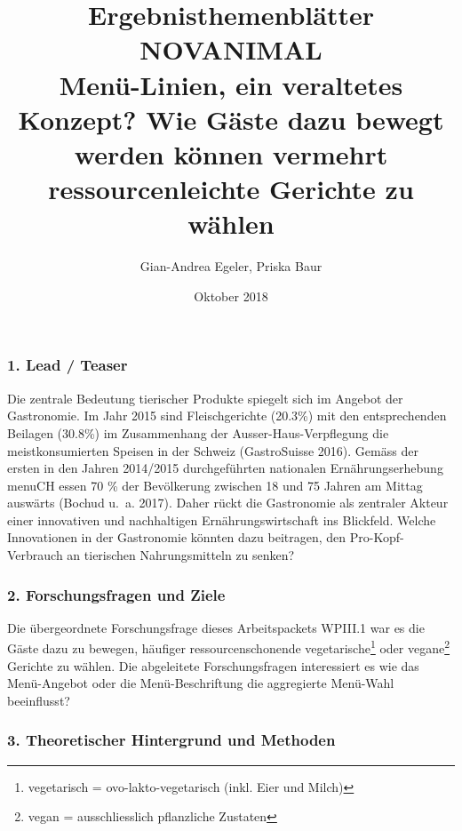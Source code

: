 \documentclass[12pt,ngerman,]{article}
\title{Ergebnisthemenblätter NOVANIMAL\\
Menü-Linien, ein veraltetes Konzept? Wie Gäste dazu bewegt werden können
vermehrt ressourcenleichte Gerichte zu wählen}
\author{Gian-Andrea Egeler, Priska Baur}
\date{Oktober 2018}
\let\rmarkdownfootnote\footnote%
\def\footnote{\protect\rmarkdownfootnote}
\begin{document}
\maketitle

\hypertarget{lead-teaser}{%
\subsubsection{1. Lead / Teaser}\label{lead-teaser}}

Die zentrale Bedeutung tierischer Produkte spiegelt sich im Angebot der
Gastronomie. Im Jahr 2015 sind Fleischgerichte (20.3\%) mit den
entsprechenden Beilagen (30.8\%) im Zusammenhang der
Ausser-Haus-Verpflegung die meistkonsumierten Speisen in der Schweiz
(GastroSuisse 2016). Gemäss der ersten in den Jahren 2014/2015
durchgeführten nationalen Ernährungserhebung menuCH essen 70 \% der
Bevölkerung zwischen 18 und 75 Jahren am Mittag auswärts (Bochud u.~a.
2017). Daher rückt die Gastronomie als zentraler Akteur einer
innovativen und nachhaltigen Ernährungswirtschaft ins Blickfeld. Welche
Innovationen in der Gastronomie könnten dazu beitragen, den
Pro-Kopf-Verbrauch an tierischen Nahrungsmitteln zu senken?

\hypertarget{forschungsfragen-und-ziele}{%
\subsubsection{2. Forschungsfragen und
Ziele}\label{forschungsfragen-und-ziele}}

Die übergeordnete Forschungsfrage dieses Arbeitspackets WPIII.1 war es
die Gäste dazu zu bewegen, häufiger ressourcenschonende
vegetarische\footnote{vegetarisch = ovo-lakto-vegetarisch (inkl. Eier
  und Milch)} oder vegane\footnote{vegan = ausschliesslich pflanzliche
  Zustaten} Gerichte zu wählen. Die abgeleitete Forschungsfragen
interessiert es wie das Menü-Angebot oder die Menü-Beschriftung die
aggregierte Menü-Wahl beeinflusst?

\hypertarget{theoretischer-hintergrund-und-methoden}{%
\subsubsection{3. Theoretischer Hintergrund und
Methoden}\label{theoretischer-hintergrund-und-methoden}}
\end{document}
